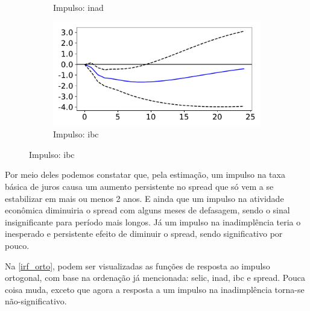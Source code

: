 \documentclass[a4paper,
               article,
               12pt,
               openany,
               oneside,
               english,
               brazil]{abntex2}
\numberwithin{equation}{section}
\begin{document}
\begin{figure}[!hbt]
\begin{subfigure}[t]{.5\linewidth}
            \caption{Impulso: inad}
        \end{subfigure}
        \begin{subfigure}[t]{.5\linewidth}
            \includegraphics[width = \textwidth, scale=1]{irf/spread_ibc.pdf}
            \caption{Impulso: ibc}
        \end{subfigure}
    \end{figure}
    
    Por meio deles podemos constatar que, pela estimação, um impulso na taxa básica de juros causa um aumento persistente no spread que só vem a se estabilizar em mais ou menos 2 anos. E ainda que um impulso na atividade econômica diminuiria o spread com alguns meses de defasagem, sendo o sinal insignificante para período mais longos. Já um impulso na inadimplência teria o inesperado e persistente efeito de diminuir o spread, sendo significativo por pouco. 

    Na \autoref{irf_orto}, podem ser visualizadas as funções de resposta ao impulso ortogonal, com base na ordenação já mencionada: selic, inad, ibc e spread. Pouca coisa muda, exceto que agora a resposta a um impulso na inadimplência torna-se não-significativo.
\end{document}
